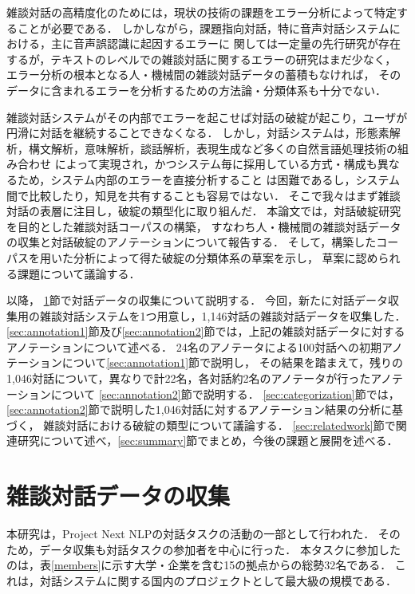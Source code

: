 \documentclass[japanese]{jnlp_1.4}
\begin{document}
雑談対話の高精度化のためには，現状の技術の課題をエラー分析によって特定することが必要である．
しかしながら，課題指向対話，特に音声対話システムにおける，主に音声誤認識に起因するエラーに
関しては一定量の先行研究が存在するが，テキストのレベルでの雑談対話に関するエラーの研究はまだ少なく，
エラー分析の根本となる人・機械間の雑談対話データの蓄積もなければ，
そのデータに含まれるエラーを分析するための方法論・分類体系も十分でない．

雑談対話システムがその内部でエラーを起こせば対話の破綻が起こり，ユーザが円滑に対話を継続することできなくなる．
しかし，対話システムは，形態素解析，構文解析，意味解析，談話解析，表現生成など多くの自然言語処理技術の組み合わせ
によって実現され，かつシステム毎に採用している方式・構成も異なるため，システム内部のエラーを直接分析すること
は困難であるし，システム間で比較したり，知見を共有することも容易ではない．
そこで我々はまず雑談対話の表層に注目し，破綻の類型化に取り組んだ．
本論文では，対話破綻研究を目的とした雑談対話コーパスの構築，
すなわち人・機械間の雑談対話データの収集と対話破綻のアノテーションについて報告する．
そして，構築したコーパスを用いた分析によって得た破綻の分類体系の草案を示し，
草案に認められる課題について議論する．

以降，
\ref{sec:data}節で対話データの収集について説明する．
今回，新たに対話データ収集用の雑談対話システムを1つ用意し，1,146対話の雑談対話データを収集した．
\ref{sec:annotation1}節及び\ref{sec:annotation2}節では，上記の雑談対話データに対するアノテーションについて述べる．
24名のアノテータによる100対話への初期アノテーションについて\ref{sec:annotation1}節で説明し，
その結果を踏まえて，残りの1,046対話について，異なりで計22名，各対話約2名のアノテータが行ったアノテーションについて
\ref{sec:annotation2}節で説明する．
\ref{sec:categorization}節では，\ref{sec:annotation2}節で説明した1,046対話に対するアノテーション結果の分析に基づく，
雑談対話における破綻の類型について議論する．
\ref{sec:relatedwork}節で関連研究について述べ，\ref{sec:summary}節でまとめ，今後の課題と展開を述べる．


\section{雑談対話データの収集}\label{sec:data}

本研究は，Project Next NLPの対話タスク\cite{NextNLPWS}の活動の一部として行われた．
そのため，データ収集も対話タスクの参加者を中心に行った．
本タスクに参加したのは，表\ref{members}に示す大学・企業を含む15の拠点からの総勢32名である．
これは，対話システムに関する国内のプロジェクトとして最大級の規模である．
\end{document}
